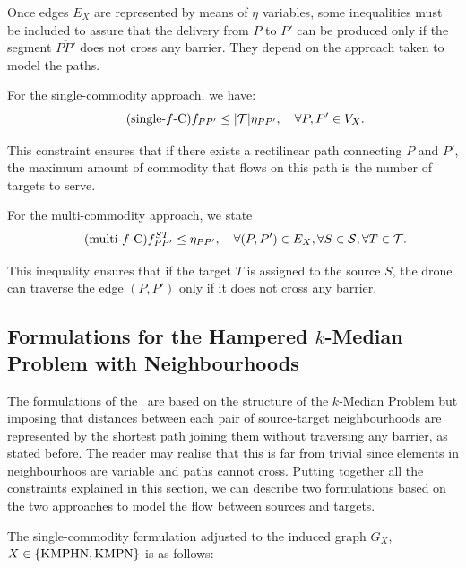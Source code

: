 \documentclass[a4paper,  review, authoryear, 1p.]{elsarticle}
\newcommand{\KMPHN}{{\sf{H-KMPHN}}}
\newcommand{\KMPN}{{\sf{H-KMPN}\xspace }}
\newcommand{\JP}[1]{{\color{blue}#1}}
\newcommand{\CV}[1]{{\color{blue}#1}}
\newcommand{\segment}[2]{\overline{#1#2}}
\begin{document}
	\CV{
		Once edges $E_X$ are represented by means of $\eta$ variables, some inequalities must be included to assure that the delivery from $P$ to $P'$ can be produced only if the segment $\segment{P}{P'}$ does not cross any barrier. They depend on the approach taken to model the paths.
		
		For the single-commodity approach, we have:
		\begin{equation*}\tag{single-$f$-C}\label{eq:single-fC}
			f_{PP'}\leq  |\mathcal T|\eta_{PP'},\quad\forall P, P'\in V_X.
		\end{equation*}
		
		This constraint ensures that if there exists a rectilinear path connecting $P$ and $P'$, the maximum amount of commodity that flows on this path is the number of targets to serve.
		
		For the multi-commodity approach, we state
		\begin{equation*}\tag{multi-$f$-C}\label{eq:multi-fC}
			f_{PP'}^{ST}\leq  \eta_{PP'},\quad\forall (P, P')\in E_X, \forall S\in\mathcal S, \forall T\in\mathcal T.
		\end{equation*}
	
		This inequality ensures that if the target $T$ is assigned to the source $S$, the drone can traverse the edge $(P, P')$ only if it does not cross any barrier.}
	
 
		
	\subsection{Formulations for the Hampered $k$-Median Problem with Neighbourhoods}\label{ssec:KMPHN}
	
	\CV{The formulations of the \KMPN \ are based on the structure of the  $k$-Median Problem but imposing that distances between each pair of source-target neighbourhoods are represented by the shortest path joining them without traversing any barrier, as stated before. \JP{The reader may realise that this is far from trivial since elements in neighbourhoos are variable and paths cannot cross.} Putting together all the constraints explained in this section, we can describe two formulations based on the two approaches to model the flow between sources and targets. 
		
	The single-commodity formulation adjusted to the induced graph $G_X$, $X\in \{\rm KMPHN, \rm KMPN\}$ is as follows:}
	
	
	\newcommand{\xvar}[2]{x(#1#2)}
\end{document}
